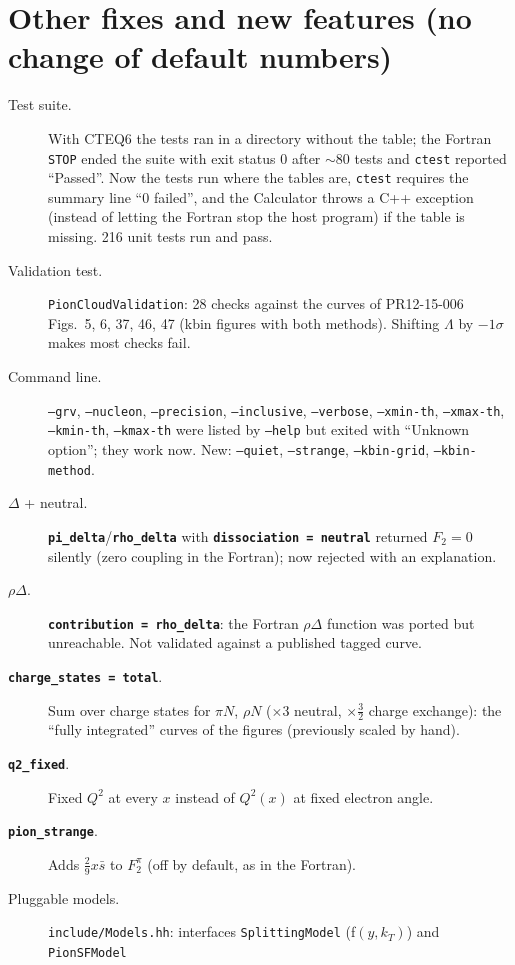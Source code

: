 \documentclass[11pt,a4paper]{article}
\newcommand{\key}[1]{\texttt{\textbf{#1}}}
\begin{document}
\section{Other fixes and new features (no change of default numbers)}
\begin{description}
\item[Test suite.] With CTEQ6 the tests ran in a directory without the table;
  the Fortran \texttt{STOP} ended the suite with exit status 0 after $\sim80$
  tests and \texttt{ctest} reported ``Passed''.  Now the tests run where the
  tables are, \texttt{ctest} requires the summary line ``0 failed'', and the
  Calculator throws a C++ exception (instead of letting the Fortran stop the
  host program) if the table is missing.  216 unit tests run and pass.
\item[Validation test.] \texttt{PionCloudValidation}: 28 checks against the
  curves of PR12-15-006 Figs.~5, 6, 37, 46, 47 (kbin figures with both
  methods).  Shifting $\Lambda$ by $-1\sigma$ makes most checks fail.
\item[Command line.] \texttt{--grv}, \texttt{--nucleon},
  \texttt{--precision}, \texttt{--inclusive}, \texttt{--verbose},
  \texttt{--xmin-th}, \texttt{--xmax-th}, \texttt{--kmin-th},
  \texttt{--kmax-th} were listed by \texttt{--help} but exited with ``Unknown
  option''; they work now.  New: \texttt{--quiet}, \texttt{--strange},
  \texttt{--kbin-grid}, \texttt{--kbin-method}.
\item[$\Delta$ + neutral.] \key{pi\_delta}/\key{rho\_delta} with
  \key{dissociation = neutral} returned $F_2=0$ silently (zero coupling in the
  Fortran); now rejected with an explanation.
\item[$\rho\Delta$.] \key{contribution = rho\_delta}: the Fortran $\rho\Delta$
  function was ported but unreachable.  Not validated against a published
  tagged curve.
\item[\key{charge\_states = total}.] Sum over charge states for $\pi N$,
  $\rho N$ ($\times3$ neutral, $\times\tfrac32$ charge exchange): the
  ``fully integrated'' curves of the figures (previously scaled by hand).
\item[\key{q2\_fixed}.] Fixed $Q^2$ at every $x$ instead of $Q^2(x)$ at fixed
  electron angle.
\item[\key{pion\_strange}.] Adds $\tfrac29x\bar s$ to $F_2^\pi$ (off by default,
  as in the Fortran).
\item[Pluggable models.] \texttt{include/Models.hh}: interfaces
  \texttt{SplittingModel} (f$(y,k_T)$) and \texttt{PionSFModel}

\end{description}
\end{document}
